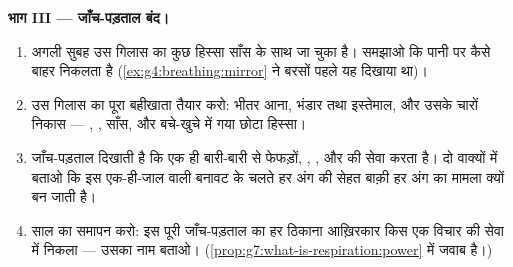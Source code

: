 \begin{problem}[{सप्ताहांत समस्या --- पानी का एक गिलास, पूरी मशीन भर
जाँचा हुआ}]
\medskip\noindent\textbf{भाग III --- जाँच-पड़ताल बंद।}
\begin{enumerate}[resume]
  \item अगली सुबह उस गिलास का कुछ हिस्सा साँस के साथ जा चुका है।
        समझाओ कि पानी  पर कैसे बाहर निकलता है
        (\cref{ex:g4:breathing:mirror} ने बरसों पहले यह दिखाया था)।
  \item उस गिलास का पूरा बहीखाता तैयार करो: भीतर आना, भंडार तथा
        इस्तेमाल, और उसके चारों निकास --- , , साँस, और
        बचे-खुचे में गया छोटा हिस्सा।
  \item जाँच-पड़ताल दिखाती है कि एक ही  बारी-बारी से फेफड़ों,
        , ,  और  की सेवा करता है। दो
        वाक्यों में बताओ कि इस एक-ही-जाल वाली बनावट के चलते हर अंग
        की सेहत बाक़ी हर अंग का मामला क्यों बन जाती है।
  \item साल का समापन करो: इस पूरी जाँच-पड़ताल का हर ठिकाना आख़िरकार
        किस एक विचार की सेवा में निकला --- उसका नाम बताओ।
        (\cref{prop:g7:what-is-respiration:power} में जवाब है।)
\end{enumerate}
\end{problem}
